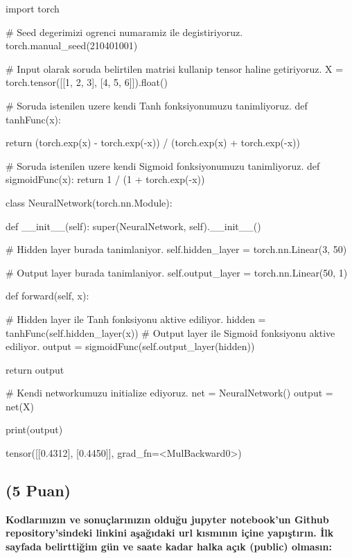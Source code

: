 \documentclass[11pt]{article}
\begin{document}
\begin{python}
import torch

# Seed degerimizi ogrenci numaramiz ile degistiriyoruz.
torch.manual_seed(210401001)

# Input olarak soruda belirtilen matrisi kullanip tensor haline getiriyoruz.
X = torch.tensor([[1, 2, 3], [4, 5, 6]]).float()

# Soruda istenilen uzere kendi Tanh fonksiyonumuzu tanimliyoruz.
def tanhFunc(x):

    return (torch.exp(x) - torch.exp(-x)) / (torch.exp(x) + torch.exp(-x))

# Soruda istenilen uzere kendi Sigmoid fonksiyonumuzu tanimliyoruz.
def sigmoidFunc(x):
    return 1 / (1 + torch.exp(-x))

class NeuralNetwork(torch.nn.Module):

    def __init__(self):
        super(NeuralNetwork, self).__init__()

        # Hidden layer burada tanimlaniyor.
        self.hidden_layer = torch.nn.Linear(3, 50)

        # Output layer burada tanimlaniyor.
        self.output_layer = torch.nn.Linear(50, 1)

    def forward(self, x):

        # Hidden layer ile Tanh fonksiyonu aktive ediliyor.
        hidden = tanhFunc(self.hidden_layer(x))
        # Output layer ile Sigmoid fonksiyonu aktive ediliyor.
        output = sigmoidFunc(self.output_layer(hidden))

        return output

# Kendi networkumuzu initialize ediyoruz.
net = NeuralNetwork()
output = net(X)

print(output)

\end{python}

tensor([[0.4312], [0.4450]], grad_fn=<MulBackward0>)

\subsection{(5 Puan)} \textbf{Kodlarınızın ve sonuçlarınızın olduğu jupyter notebook'un Github repository'sindeki linkini aşağıdaki url kısmının içine yapıştırın. İlk sayfada belirttiğim gün ve saate kadar halka açık (public) olmasın:}
\end{document}
